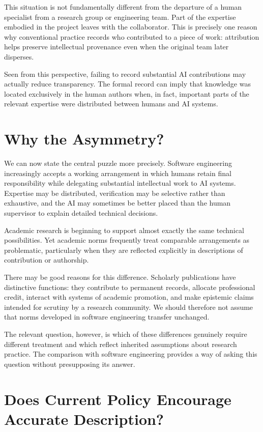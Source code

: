 This situation is not fundamentally different from the departure of a human specialist from a research group or engineering team. Part of the expertise embodied in the project leaves with the collaborator. This is precisely one reason why conventional practice records who contributed to a piece of work: attribution helps preserve intellectual provenance even when the original team later disperses.

Seen from this perspective, failing to record substantial AI contributions may actually reduce transparency. The formal record can imply that knowledge was located exclusively in the human authors when, in fact, important parts of the relevant expertise were distributed between humans and AI systems.


\section{Why the Asymmetry?}

We can now state the central puzzle more precisely. Software engineering increasingly accepts a working arrangement in which humans retain final responsibility while delegating substantial intellectual work to AI systems. Expertise may be distributed, verification may be selective rather than exhaustive, and the AI may sometimes be better placed than the human supervisor to explain detailed technical decisions.

Academic research is beginning to support almost exactly the same technical possibilities. Yet academic norms frequently treat comparable arrangements as problematic, particularly when they are reflected explicitly in descriptions of contribution or authorship.

There may be good reasons for this difference. Scholarly publications have distinctive functions: they contribute to permanent records, allocate professional credit, interact with systems of academic promotion, and make epistemic claims intended for scrutiny by a research community. We should therefore not assume that norms developed in software engineering transfer unchanged.

The relevant question, however, is which of these differences genuinely require different treatment and which reflect inherited assumptions about research practice. The comparison with software engineering provides a way of asking this question without presupposing its answer.


\section{Does Current Policy Encourage Accurate Description?}

